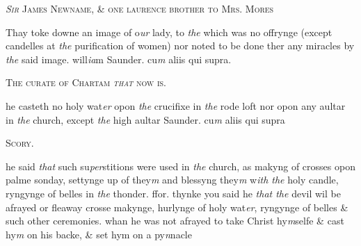 \documentclass[12pt, a4paper]{book}
\begin{document}
            
               
				\begin{center} \begin{large} {\scshape 
               	\textit{Sir} James Newname, \& one laurence
 brother to Mrs. Mores} \end{large} \end{center}
			

            	
				\marginpar[\vspace{0.5cm}{\textcolor{Gray}{Images}}]{}
			
		\ifthenelse{\isodd{\thepage}}
		{\reversemarginpar}
		{\normalmarginpar}
		Thay toke downe an image of o\textit{ur} lady, to \textit{the} which
 was no offrynge (except candelles at \textit{the} purification of
 women) nor noted to be done ther any miracles by \textit{the}
 said image. will\textit{ia}m Saunder. cu\textit{m} aliis qui supra.
 

            
               
				\begin{center} \begin{large} {\scshape The curate of Chartam \textit{that} now is.} \end{large} \end{center}
			

            	
				\marginpar[\vspace{0.5cm}{\textcolor{Gray}{holy water}}]{}
			
		\ifthenelse{\isodd{\thepage}}
		{\reversemarginpar}
		{\normalmarginpar}
		he casteth no holy wat\textit{er} opon \textit{the} crucifixe in \textit{the} rode loft
 nor opon any aultar in \textit{the} church, except \textit{the} high aultar
            		Saunder. cu\textit{m} aliis qui supra
 

            
            	
				\begin{center} \begin{large} {\scshape Scory.} \end{large} \end{center}
			


	
				\marginpar[\vspace{0.5cm}{\textcolor{Gray}{ceremonies}}]{}
			
	
		\ifthenelse{\isodd{\thepage}}
		{\reversemarginpar}
		{\normalmarginpar}
		he said \textit{that} such su\textit{per}stitions were used in \textit{the} church, as makyng
 of crosses opon palme sonday, settynge up of they\textit{m} and blessyng
 they\textit{m} w\textit{ith the} holy candle, ryngynge of belles in \textit{the} thonder.
 ffor. thynke you said he \textit{that the} devil wil be afrayed or fleaway crosse makynge, hurlynge of holy wat\textit{er}, ryngynge
 of belles \& such other ceremonies. whan he was not
 afrayed to take Christ hy\textit{m}selfe \& cast hy\textit{m} on his backe,
 \& set hym on a py\textit{n}nacle
	
\end{document}
